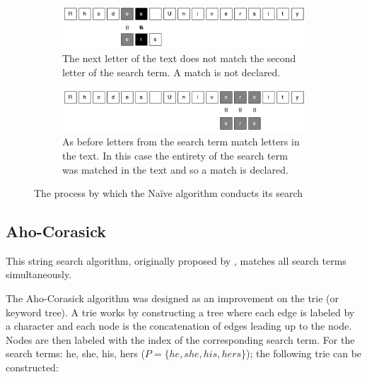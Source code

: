 \documentclass{article}
\begin{document}
\begin{figure}[hbt]
  \begin{subfigure}{\textwidth}
  \makeatletter
  \includegraphics[width=\textwidth]{images/naive-4}
  \caption{The next letter of the text does not match the second letter of the search term. A match is not declared.}
  \end{subfigure}
  
  \begin{subfigure}{\textwidth}
  \makeatletter
  \includegraphics[width=\textwidth]{images/naive-5}
  \caption{As before letters from the search term match letters in the text. In this case the entirety of the search term was matched in the text and so a match is declared.}
  \end{subfigure}
  
  \caption{The process by which the Na{\"i}ve algorithm conducts its search}
  
\end{figure}

\subsection{Aho-Corasick}
This string search algorithm, originally proposed by \cite{Aho1975}, matches all search terms simultaneously.

The Aho-Corasick algorithm was designed as an improvement on the trie (or keyword tree). A trie works by constructing a tree where each edge is labeled by a character and each node is the concatenation of edges leading up to the node. Nodes are then labeled with the index of the corresponding search term. For the search terms: he, she, his, hers (\(P = \{he, she, his, hers\}\)); the following trie can be constructed: 
\end{document}
